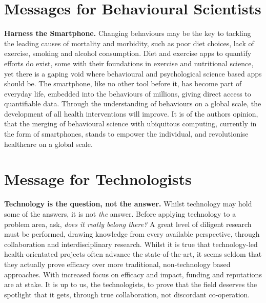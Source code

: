 \section{Messages for Behavioural Scientists}
\textbf{Harness the Smartphone.}
Changing behaviours may be the key to tackling the leading causes of mortality and morbidity, such as poor diet choices, lack of exercise, smoking and alcohol consumption. Diet and exercise apps to quantify efforts do exist, some with their foundations in exercise and nutritional science, yet there is a gaping void where behavioural and psychological science based apps should be. 
The smartphone, like no other tool before it, has become part of everyday life, embedded into the behaviours of millions, giving direct access to quantifiable data. Through the understanding of behaviours on a global scale, the development of all health interventions will improve. It is of the authors opinion, that the merging of behavioural science with ubiquitous computing, currently in the form of smartphones, stands to empower the individual, and revolutionise healthcare on a global scale. 

\section{Message for Technologists}
\textbf{Technology is the question, not the answer.}
Whilst technology may hold some of the answers, it is not \textit{the} answer. Before applying technology to a problem area, ask, \textit{does it really belong there?}
A great level of diligent research must be performed, drawing knowledge from every available perspective, through collaboration and interdisciplinary research. Whilst it is true that technology-led health-orientated projects often advance the state-of-the-art, it seems seldom that they actually prove efficacy over more traditional, non-technology based approaches. With increased focus on efficacy and impact, funding and reputations are at stake. It is up to us, the technologists, to prove that the field deserves the spotlight that it gets, through true collaboration, not discordant co-operation.